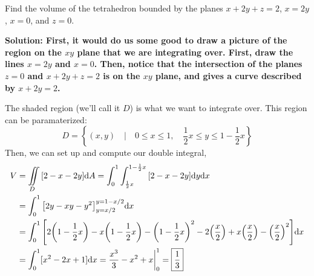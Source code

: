 \begin{example}
    Find the volume of the tetrahedron bounded by the planes \( x+2y+z=2 \), \( x=2y \), \( x=0 \), and \( z=0 \). \par\bf{Solution: }First, it would do us some good to draw a picture of the region on the \( xy \) plane that we are integrating over. First, draw the lines \( x=2y \) and \( x=0 \). Then, notice that the intersection of the planes \( z=0 \) and \( x+2y+z=2 \) is on the \( xy \) plane, and gives a curve described by \( x+2y=2 \). \par
    \begin{figure}[h!]
        \centering
    \end{figure}
    The shaded region (we'll call it \( D \)) is what we want to integrate over. This region can be paramaterized:
    \[ D = \left\{ (x,y)\quad |\quad 0\leq x\leq 1,\quad \frac{1}{2}x\leq y\leq 1-\frac{1}{2}x\right\}\]
    Then, we can set up and compute our double integral,
    \begin{align*}
        V &= \iint\limits_D \bqty{2-x-2y}\dd A = \int_0^1\int_{\frac{1}{2}x}^{1-\frac{1}{2}x}\bqty{2-x-2y}\dd y\dd x \\
        &= \int_0^1 \bqty{2y-xy-y^2}_{y=x/2}^{y=1-x/2}\dd x \\
        &= \int_0^1\bqty{2\pqty{1-\frac{1}{2}x}-x\pqty{1-\frac{1}{2}x}-\pqty{1-\frac{1}{2}x}^2 - 2\pqty{\frac{x}{2}}+x\pqty{\frac{x}{2}}-\pqty{\frac{x}{2}}^2}\dd x \\
        &= \int_0^1 [x^2-2x+1]\dd x = \frac{x^3}{3}-x^2+x\biggr|_0^1 = \boxed{\frac{1}3} 
    \end{align*}
\end{example}
